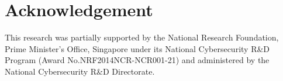 \section{Acknowledgement}
This research was partially supported by the National Research 
Foundation, Prime Minister’s Office, Singapore under its National Cybersecurity 
R\&D Program (Award No.NRF2014NCR-NCR001-21) and administered 
by the National Cybersecurity R\&D Directorate.
